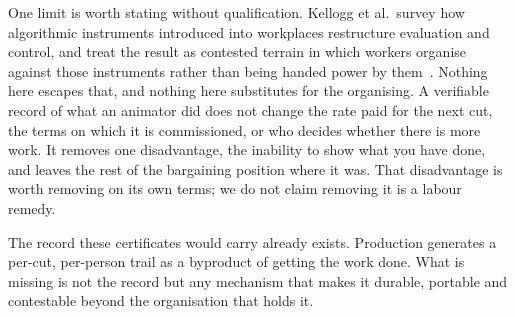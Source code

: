 One limit is worth stating without qualification. Kellogg et al.\ survey how
algorithmic instruments introduced into workplaces restructure evaluation and control,
and treat the result as contested terrain in which workers organise against those
instruments rather than being handed power by them~\cite{kellogg2020algorithms}.
Nothing here escapes that, and nothing here substitutes for the organising. A verifiable
record of what an animator did does not change the rate paid for the next cut, the terms on
which it is commissioned, or who decides whether there is more work. It removes one
disadvantage, the inability to show what you have done, and leaves the rest of the
bargaining position where it was. That disadvantage is worth removing on its own terms; we
do not claim removing it is a labour remedy.

The record these certificates would carry already exists. Production generates a
per-cut, per-person trail as a byproduct of getting the work done. What is missing
is not the record but any mechanism that makes it durable, portable and
contestable beyond the organisation that holds it.
